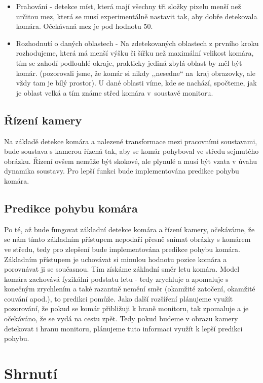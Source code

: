 \documentclass[a4paper,10pt]{article}
\begin{document}
\begin{itemize}
 \item Prahování - detekce míst, která mají všechny tři složky pixelu menší než určitou mez, která se musí experimentálně nastavit tak, aby dobře detekovala komára. Očekávaná mez je pod hodnotu 50.
 \item Rozhodnutí o daných oblastech - Na zdetekovaných oblastech z prvního kroku rozhodujeme, která má menší výšku či šířku než maximální velikost komára, tím se zahodí podlouhlé okraje, prakticky jediná zbylá oblast by měl být komár. (pozorovali jsme, že komár si nikdy ,,nesedne`` na~kraj obrazovky, ale vždy tam je bílý prostor). U dané oblasti víme, kde se nachází, spočteme, jak je oblast velká a tím známe střed komára v~soustavě monitoru.
\end{itemize}

\subsection{Řízení kamery}
Na základě detekce komára a nalezené transformace mezi pracovními soustavami, bude soustava s kamerou řízená tak, aby se komár pohyboval ve středu sejmutého obrázku. Řízení ovšem nemůže být skokové, ale plynulé a musí být vzata v úvahu dynamika soustavy. Pro lepší funkci bude implementována predikce pohybu komára.

\subsection{Predikce pohybu komára}

Po té, až bude fungovat základní detekce komára a řízení kamery, očekáváme, že se nám tímto základním přístupem nepodaří přesně snímat obrázky s komárem ve středu, tedy pro zlepšení bude implementována predikce pohybu komára. Základním přístupem je uchovávat si minulou hodnotu pozice komára a porovnávat ji se současnou. Tím získáme základní směr letu komára. Model komára zachovává fyzikální podstatu letu - tedy zrychluje a zpomaluje s konečným zrychlením a také razantně nemění směr (okamžité zatočení, okamžité couvání apod.), to predikci pomůže. Jako další rozšíření plánujeme využít pozorování, že pokud se komár přibližuji k hraně monitoru, tak zpomaluje a je očekáváno, že se vydá na cestu zpět. Tedy pokud budeme v obrazu kamery detekovat i hranu monitoru, plánujeme tuto informaci využít k lepší predikci pohybu.

\section{Shrnutí}
\end{document}
